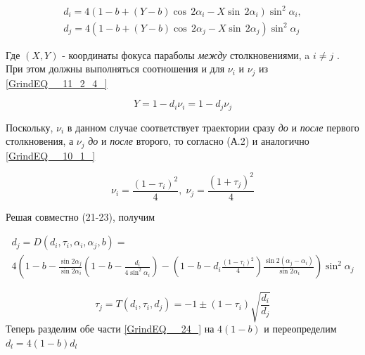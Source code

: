 \documentclass[a4paper]{article}
\begin{document}
\begin{equation} \label{GrindEQ__21_2} \begin{array}{l} {d_{i} =4\left(1-b+\left(Y-b\right)\cos \, 2\alpha _{i} -X\sin \, 2\alpha _{i} \right)\sin ^{2} \alpha _{i} ,} \\ {d_{j} =4\left(1-b+\left(Y-b\right)\cos \, 2\alpha _{j} -X\sin \, 2\alpha _{j} \right)\sin ^{2} \alpha _{j} } \end{array} \end{equation}

Где $\left(X,Y\right)$ - координаты фокуса параболы \textit{между} столкновениями, a $i\ne j$ . При этом должны выполняться соотношения и для $\nu _{i} $ и $\nu _{j} $ из \eqref{GrindEQ__11_2_4_}

\begin{equation} \label{GrindEQ__22_} Y=1-d_{i} \nu _{i} =1-d_{j} \nu _{j}  \end{equation}

Поскольку, $\nu _{i} $ в данном случае соответствует траектории сразу \textit{до }и \textit{после} первого столкновения, а $\nu _{j} $ \textit{до} и \textit{после }второго, то согласно (А.2) и аналогично \eqref{GrindEQ__10_1_}

\begin{equation} \label{GrindEQ__23_} \nu _{i} =\frac{\left(1-\tau _{i} \right)^{2} }{4} ,\; \nu _{j} =\frac{\left(1+\tau _{j} \right)^{2} }{4}  \end{equation}

Решая совместно (21-23), получим

\begin{equation} \label{GrindEQ__24_}\begin{array}{l} {d_{j} =D\left(d_{i} ,\tau _{i} ,\alpha _{i} ,\alpha _{j} ,b\right)=} \\ {4\left(1-b-\frac{\sin 2\alpha _{j} }{\sin 2\alpha _{i} } \left(1-b-\frac{d_{i} }{4\sin ^{2} \alpha _{i} } \right)-\left(1-b-d_{i} \frac{\left(1-\tau _{i} \right)^{2} }{4} \right)\frac{\sin 2\left(\alpha _{j} -\alpha _{i} \right)}{\sin 2\alpha _{i} } \right)\sin ^{2} \alpha _{j} } \end{array} \end{equation}

\begin{equation} \label{GrindEQ__25_} \tau _{j} =T\left(d_{i} ,\tau _{i} ,d_{j} \right)=-1\pm \left(1-\tau _{i} \right)\sqrt{\frac{d_{i} }{d_{j} } }\end{equation}
Теперь разделим обе части \eqref{GrindEQ__24_} на $4(1-b)$ и переопределим $d_l = 4(1-b) d_l$
\end{document}
